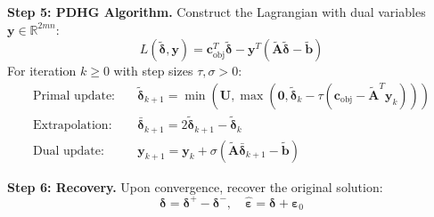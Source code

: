 \documentclass{article}
\begin{document}
\textbf{Step 5: PDHG Algorithm.} Construct the Lagrangian with dual variables $\mathbf{y} \in \mathbb{R}^{2mn}$:
\begin{equation}
    L(\tilde{\boldsymbol{\delta}}, \mathbf{y}) = \mathbf{c}_{\text{obj}}^T \tilde{\boldsymbol{\delta}} - \mathbf{y}^T(\tilde{\mathbf{A}}\tilde{\boldsymbol{\delta}} - \tilde{\mathbf{b}})
\end{equation}
For iteration $k \ge 0$ with step sizes $\tau, \sigma > 0$:
\begin{align}
    \text{Primal update:} \quad & \tilde{\boldsymbol{\delta}}_{k+1} = \min\left(\mathbf{U}, \max\left(\mathbf{0}, \tilde{\boldsymbol{\delta}}_k - \tau (\mathbf{c}_{\text{obj}} - \tilde{\mathbf{A}}^T \mathbf{y}_k)\right)\right) \\
    \text{Extrapolation:} \quad & \bar{\boldsymbol{\delta}}_{k+1} = 2\tilde{\boldsymbol{\delta}}_{k+1} - \tilde{\boldsymbol{\delta}}_k \\
    \text{Dual update:} \quad & \mathbf{y}_{k+1} = \mathbf{y}_k + \sigma (\tilde{\mathbf{A}}\bar{\boldsymbol{\delta}}_{k+1} - \tilde{\mathbf{b}})
\end{align}

\textbf{Step 6: Recovery.} Upon convergence, recover the original solution:
\begin{equation}
    \boldsymbol{\delta} = \boldsymbol{\delta}^+ - \boldsymbol{\delta}^-, \quad \hat{\boldsymbol{\varepsilon}} = \boldsymbol{\delta} + \boldsymbol{\varepsilon}_0
\end{equation}
\end{document}
